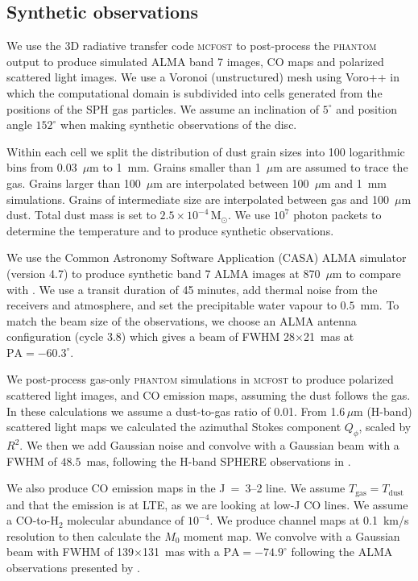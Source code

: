 \documentclass[usenatbib,a4paper,times]{mnras}
\renewcommand{\sun}{\mathrm{M}_{\odot}}
\newcommand{\mcfost}{\textsc{mcfost}}
\renewcommand{\phantom}{\textsc{phantom}}
\begin{document}
\subsection{Synthetic observations}

We use the 3D radiative transfer code \mcfost{} \citep{pinte:2006, pinte:2009}
to post-process the \phantom{} output to produce simulated ALMA band 7 images,
CO maps and polarized scattered light images. We use a Voronoi (unstructured)
mesh using Voro++ \citep{rycroft:2009} in which the computational domain is
subdivided into cells generated from the positions of the SPH gas particles. We
assume an inclination of $5^{\circ}$ and position angle $152^{\circ}$
\citep{huang:2018} when making synthetic observations of the disc.

Within each cell we split the distribution of dust grain sizes into 100
logarithmic bins from 0.03~$\mu$m to 1~mm. Grains smaller than 1~$\mu$m are
assumed to trace the gas. Grains larger than 100~$\mu$m are interpolated between
100~$\mu$m and 1~mm simulations. Grains of intermediate size are interpolated
between gas and 100~$\mu$m dust. Total dust mass is set to $2.5\times
10^{-4}\,\sun{}$. We use $10^7$ photon packets to determine the temperature and
to produce synthetic observations.

We use the Common Astronomy Software Application (CASA) ALMA simulator (version
4.7) to produce synthetic band 7 ALMA images at 870~$\mu$m to compare with
\citet{andrews:2016}. We use a transit duration of 45 minutes, add thermal noise
from the receivers and atmosphere, and set the precipitable water vapour to
$0.5$~mm. To match the beam size of the observations, we choose an ALMA antenna
configuration (cycle 3.8) which gives a beam of FWHM 28$\times$21~mas at
$\mathrm{PA}=-60.3^{\circ}$.

We post-process gas-only \phantom{} simulations in \mcfost{} to produce
polarized scattered light images, and CO emission maps, assuming the dust
follows the gas. In these calculations we assume a dust-to-gas ratio of 0.01.
From 1.6$\,\mu$m (H-band) scattered light maps we calculated the azimuthal
Stokes component $Q_{\phi}$, scaled by $R^2$. We then we add Gaussian noise and
convolve with a Gaussian beam with a FWHM of $48.5$~mas, following the H-band
SPHERE observations in \citet{van-boekel:2017}.

We also produce CO emission maps in the J~=~3--2 line. We assume
$T_{\mathrm{gas}} = T_{\mathrm{dust}}$ and that the emission is at LTE, as we
are looking at low-J CO lines. We assume a CO-to-H${}_2$ molecular abundance of
$10^{-4}$. We produce channel maps at 0.1~km/s resolution to then calculate the
$M_0$ moment map. We convolve with a Gaussian beam with FWHM of
139$\times$131~mas with a $\mathrm{PA}=-74.9^{\circ}$ following the ALMA
observations presented by \citet{huang:2018}.
\end{document}
